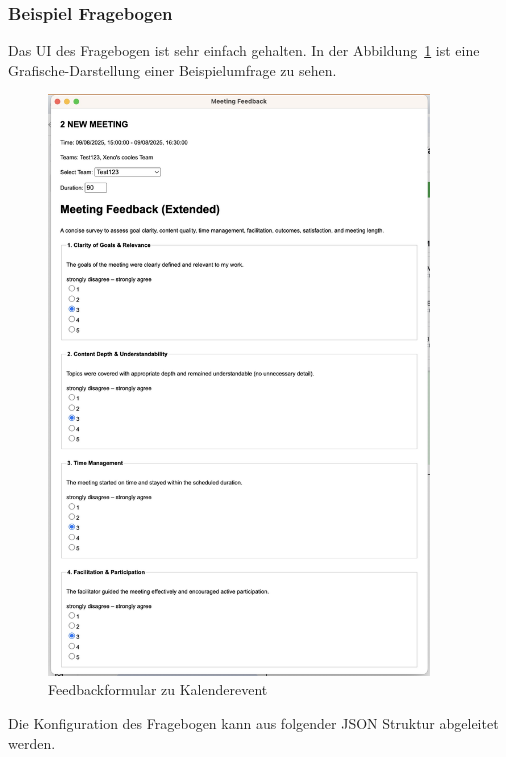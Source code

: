 \documentclass[12pt,a4paper]{report}
\begin{document}
    \subsubsection{Beispiel Fragebogen}
        Das UI des Fragebogen ist sehr einfach gehalten. In der Abbildung~\ref{fig:yappi-extension-feedback} ist eine Grafische-Darstellung
        einer Beispielumfrage zu sehen.

        \begin{figure}[H]
          \centering
          \includegraphics[width=0.90\textwidth]{../figures/yappi-chrome-extension/yappi-extension-feedback.jpg}
          \caption{Feedbackformular zu Kalenderevent}
          \label{fig:yappi-extension-feedback}
        \end{figure}

        Die Konfiguration des Fragebogen kann aus folgender JSON Struktur abgeleitet werden.
\end{document}
